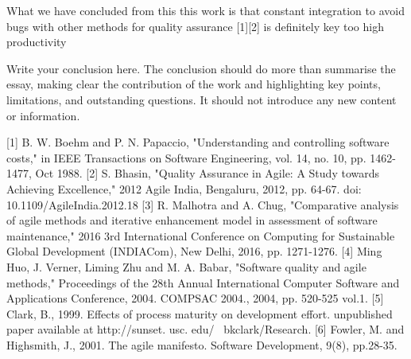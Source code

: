 \documentclass{scrartcl}
\begin{document}
What we have concluded from this this work is that constant integration to avoid bugs with other methods for quality assurance [1][2] is definitely key too  high productivity

Write your conclusion here. The conclusion should do more than summarise the essay, making clear the contribution of the work and highlighting key points, limitations, and outstanding questions. It should not introduce any new content or information.



[1] B. W. Boehm and P. N. Papaccio, "Understanding and controlling software costs," in IEEE Transactions on Software Engineering, vol. 14, no. 10, pp. 1462-1477, Oct 1988.
[2] S. Bhasin, "Quality Assurance in Agile: A Study towards Achieving Excellence," 2012 Agile India, Bengaluru, 2012, pp. 64-67.
doi: 10.1109/AgileIndia.2012.18
[3] R. Malhotra and A. Chug, "Comparative analysis of agile methods and iterative enhancement model in assessment of software maintenance," 2016 3rd International Conference on Computing for Sustainable Global Development (INDIACom), New Delhi, 2016, pp. 1271-1276.
[4] Ming Huo, J. Verner, Liming Zhu and M. A. Babar, "Software quality and agile methods," Proceedings of the 28th Annual International Computer Software and Applications Conference, 2004. COMPSAC 2004., 2004, pp. 520-525 vol.1.
[5] Clark, B., 1999. Effects of process maturity on development effort. unpublished paper available at http://sunset. usc. edu/~ bkclark/Research.
[6] Fowler, M. and Highsmith, J., 2001. The agile manifesto. Software Development, 9(8), pp.28-35.
\end{document}
